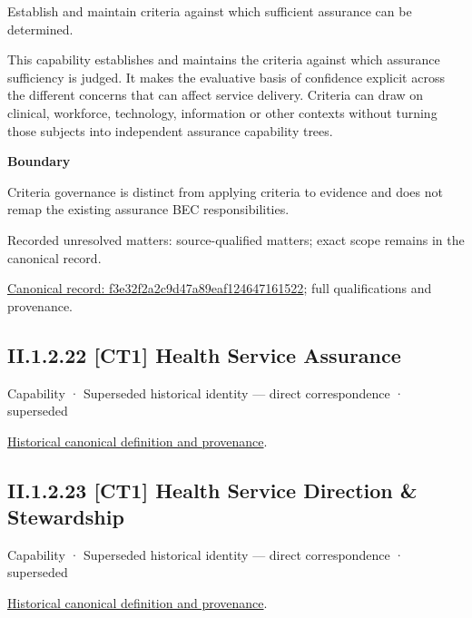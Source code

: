 Establish and maintain criteria against which sufficient assurance can be determined.



This capability establishes and maintains the criteria against which assurance sufficiency is judged. It makes the evaluative basis of confidence explicit across the different concerns that can affect service delivery. Criteria can draw on clinical, workforce, technology, information or other contexts without turning those subjects into independent assurance capability trees.



\textbf{Boundary}



Criteria governance is distinct from applying criteria to evidence and does not remap the existing assurance BEC responsibilities.


{\small Recorded unresolved matters: source-qualified matters; exact scope remains in the canonical record.}\par
{\footnotesize \href{../../../../continuum/strategy/capability/f3e32f2a2c9d47a89eaf124647161522.md}{Canonical record: f3e32f2a2c9d47a89eaf124647161522}; full qualifications and provenance.}\par
\subsection*{II.1.2.22 [CT1] Health Service Assurance}
\label{navigation:II.1.2.22}

\label{element:6a82dc1423374e809dbf542eeaa69482}
{\small Capability · Superseded historical identity — direct correspondence · superseded}\par
\href{../../../../continuum/strategy/capability/6a82dc1423374e809dbf542eeaa69482.md}{Historical canonical definition and provenance}.\par
\subsection*{II.1.2.23 [CT1] Health Service Direction \& Stewardship}
\label{navigation:II.1.2.23}

\label{element:360bf50f92484448a01cc57f2dbce23c}
{\small Capability · Superseded historical identity — direct correspondence · superseded}\par
\href{../../../../continuum/strategy/capability/360bf50f92484448a01cc57f2dbce23c.md}{Historical canonical definition and provenance}.\par
